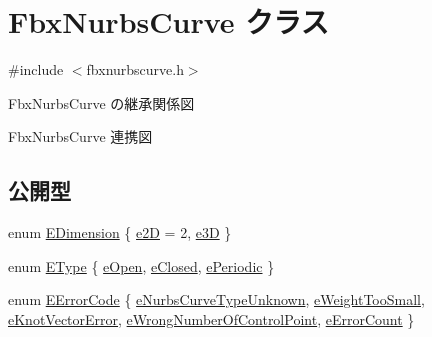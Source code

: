 \hypertarget{class_fbx_nurbs_curve}{}\section{Fbx\+Nurbs\+Curve クラス}
\label{class_fbx_nurbs_curve}


{\ttfamily \#include $<$fbxnurbscurve.\+h$>$}



Fbx\+Nurbs\+Curve の継承関係図


Fbx\+Nurbs\+Curve 連携図
\subsection*{公開型}
\begin{DoxyCompactItemize}
\item 
enum \hyperlink{class_fbx_nurbs_curve_a95d4a63cff6dd62901ea39c268336122}{E\+Dimension} \{ \hyperlink{class_fbx_nurbs_curve_a95d4a63cff6dd62901ea39c268336122aa19c626c6b5212fad0925ae176b55a75}{e2D} = 2, 
\hyperlink{class_fbx_nurbs_curve_a95d4a63cff6dd62901ea39c268336122ae726a5a8f85e1caff03b1dbb7b5c1faf}{e3D}
 \}
\item 
enum \hyperlink{class_fbx_nurbs_curve_a9f232f09798b106dcc2fd5e2d8c117ed}{E\+Type} \{ \hyperlink{class_fbx_nurbs_curve_a9f232f09798b106dcc2fd5e2d8c117edadb8a90e70a0d0cf0eeb4536f235a8efa}{e\+Open}, 
\hyperlink{class_fbx_nurbs_curve_a9f232f09798b106dcc2fd5e2d8c117edad58a95fb9cd8889d7aa4fcbc51d23b1a}{e\+Closed}, 
\hyperlink{class_fbx_nurbs_curve_a9f232f09798b106dcc2fd5e2d8c117edad193b7daf94b335e0bce1469b6b370d1}{e\+Periodic}
 \}
\item 
enum \hyperlink{class_fbx_nurbs_curve_a6f0e188ec4b87e234b4c745098263f1d}{E\+Error\+Code} \{ \newline
\hyperlink{class_fbx_nurbs_curve_a6f0e188ec4b87e234b4c745098263f1da5c449267036aae4d4fe70634dfc08a00}{e\+Nurbs\+Curve\+Type\+Unknown}, 
\hyperlink{class_fbx_nurbs_curve_a6f0e188ec4b87e234b4c745098263f1da461609ac9d88fa06452ac9c33d11b2c3}{e\+Weight\+Too\+Small}, 
\hyperlink{class_fbx_nurbs_curve_a6f0e188ec4b87e234b4c745098263f1da4bdb56d4b4c950d0dc56c88164427c25}{e\+Knot\+Vector\+Error}, 
\hyperlink{class_fbx_nurbs_curve_a6f0e188ec4b87e234b4c745098263f1da46967ffae3b4bfeccf94f7cc600eb89e}{e\+Wrong\+Number\+Of\+Control\+Point}, 
\newline
\hyperlink{class_fbx_nurbs_curve_a6f0e188ec4b87e234b4c745098263f1da01f8c89e9ca91f90bd1829d041de5969}{e\+Error\+Count}
 \}
\end{DoxyCompactItemize}
